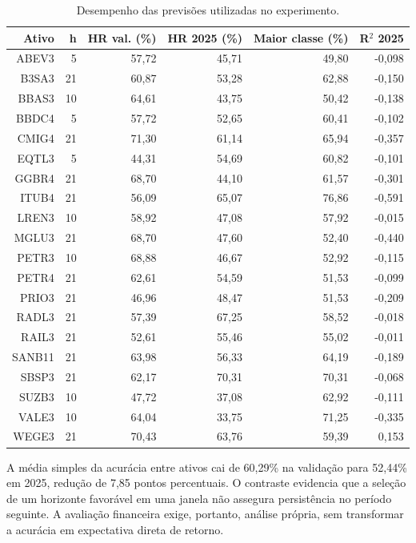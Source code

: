 \begin{table}[H]
\centering
\caption{Desempenho das previsões utilizadas no experimento.}
\label{tab:xgb_teste_2025}
{\footnotesize
\begin{tabular}{@{}rrrrrr@{}}
\hline
Ativo & h & HR val. (\%) & HR 2025 (\%) & Maior classe (\%) & R$^{2}$ 2025 \\ \hline
ABEV3 & 5 & 57,72 & 45,71 & 49,80 & -0,098 \\
B3SA3 & 21 & 60,87 & 53,28 & 62,88 & -0,150 \\
BBAS3 & 10 & 64,61 & 43,75 & 50,42 & -0,138 \\
BBDC4 & 5 & 57,72 & 52,65 & 60,41 & -0,102 \\
CMIG4 & 21 & 71,30 & 61,14 & 65,94 & -0,357 \\
EQTL3 & 5 & 44,31 & 54,69 & 60,82 & -0,101 \\
GGBR4 & 21 & 68,70 & 44,10 & 61,57 & -0,301 \\
ITUB4 & 21 & 56,09 & 65,07 & 76,86 & -0,591 \\
LREN3 & 10 & 58,92 & 47,08 & 57,92 & -0,015 \\
MGLU3 & 21 & 68,70 & 47,60 & 52,40 & -0,440 \\
PETR3 & 10 & 68,88 & 46,67 & 52,92 & -0,115 \\
PETR4 & 21 & 62,61 & 54,59 & 51,53 & -0,099 \\
PRIO3 & 21 & 46,96 & 48,47 & 51,53 & -0,209 \\
RADL3 & 21 & 57,39 & 67,25 & 58,52 & -0,018 \\
RAIL3 & 21 & 52,61 & 55,46 & 55,02 & -0,011 \\
SANB11 & 21 & 63,98 & 56,33 & 64,19 & -0,189 \\
SBSP3 & 21 & 62,17 & 70,31 & 70,31 & -0,068 \\
SUZB3 & 10 & 47,72 & 37,08 & 62,92 & -0,111 \\
VALE3 & 10 & 64,04 & 33,75 & 71,25 & -0,335 \\
WEGE3 & 21 & 70,43 & 63,76 & 59,39 & 0,153 \\
\hline
\end{tabular}}
\par{}
\end{table}

A média simples da acurácia entre ativos cai de 60,29\% na validação para 52,44\% em 2025, redução de 7,85 pontos percentuais. O contraste evidencia que a seleção de um horizonte favorável em uma janela não assegura persistência no período seguinte. A avaliação financeira exige, portanto, análise própria, sem transformar a acurácia em expectativa direta de retorno.

